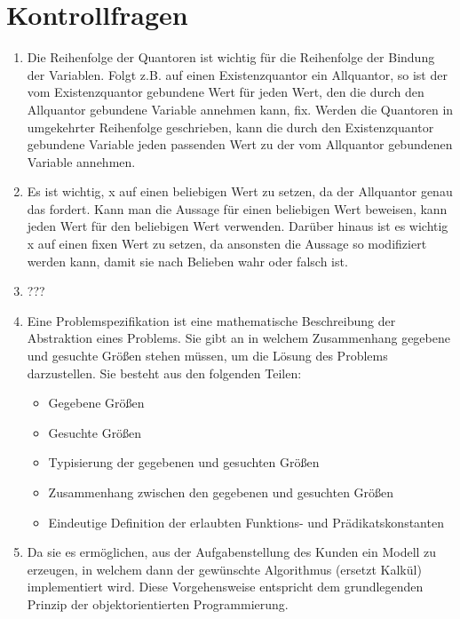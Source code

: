 \documentclass[a4paper]{article}
\begin{document}
	\section{Kontrollfragen}
	\begin{enumerate}
		\item
		Die Reihenfolge der Quantoren ist wichtig für die Reihenfolge der Bindung der Variablen.
		Folgt z.B. auf einen Existenzquantor ein Allquantor, so ist der vom Existenzquantor gebundene Wert für jeden Wert, den die durch den Allquantor gebundene Variable annehmen kann, fix.
		Werden die Quantoren in umgekehrter Reihenfolge geschrieben, kann die durch den Existenzquantor gebundene Variable jeden passenden Wert zu der vom Allquantor gebundenen Variable annehmen.
		
		\item
		Es ist wichtig, x auf einen beliebigen Wert zu setzen, da der Allquantor genau das fordert. Kann man die Aussage für einen beliebigen Wert beweisen, kann jeden Wert für den beliebigen Wert verwenden.
		Darüber hinaus ist es wichtig x auf einen fixen Wert zu setzen, da ansonsten die Aussage so modifiziert werden kann, damit sie nach Belieben wahr oder falsch ist.
		
		\item
		???
		
		\item
		Eine Problemspezifikation ist eine mathematische Beschreibung der Abstraktion eines Problems.
		Sie gibt an in welchem Zusammenhang gegebene und gesuchte Größen stehen müssen, um die Lösung des Problems darzustellen.
		Sie besteht aus den folgenden Teilen:
		\begin{itemize}
			\item Gegebene Größen
			\item Gesuchte Größen
			\item Typisierung der gegebenen und gesuchten Größen
			\item Zusammenhang zwischen den gegebenen und gesuchten Größen
			\item Eindeutige Definition der erlaubten Funktions- und Prädikatskonstanten
		\end{itemize}
		
		\item
		Da sie es ermöglichen, aus der Aufgabenstellung des Kunden ein Modell zu erzeugen, in welchem dann der gewünschte Algorithmus (ersetzt Kalkül) implementiert wird. Diese Vorgehensweise entspricht dem grundlegenden Prinzip der objektorientierten Programmierung.
		

\end{enumerate}
\end{document}
